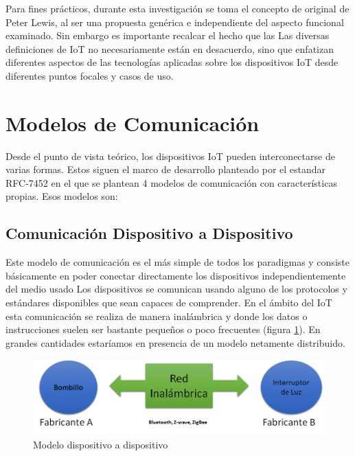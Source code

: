 Para fines prácticos, durante esta investigación se toma el concepto de original de Peter Lewis, al ser una propuesta genérica e independiente del aspecto funcional examinado. Sin embargo es importante recalcar el hecho que las Las diversas definiciones de IoT no necesariamente están en desacuerdo, sino que enfatizan diferentes aspectos de las tecnologías aplicadas sobre los dispositivos IoT desde diferentes puntos focales y casos de uso\cite{iotInternetSociety}.

\vspace{50px}

\section{Modelos de Comunicación}
Desde el punto de vista teórico, los dispositivos IoT pueden interconectarse de varias formas. Estos siguen el marco de desarrollo planteado por el estandar RFC-7452\cite{rfc7452} en el que se plantean 4 modelos de comunicación con características propias. Esos modelos son:

\subsection{Comunicación Dispositivo a Dispositivo}
Este modelo de comunicación es el más simple de todos los paradigmas y consiste básicamente en poder conectar directamente los dispositivos independientemente del medio usado Los dispositivos se comunican usando alguno de los protocolos y estándares disponibles que sean capaces de comprender. En el ámbito del IoT esta comunicación se realiza de manera inalámbrica y donde los datos o instrucciones suelen ser bastante pequeños o poco frecuentes (figura \ref{fig:d2d}). En grandes cantidades estaríamos en presencia de un modelo netamente distribuido.
\begin{figure}[htb]
\centering
\includegraphics[scale=0.38]{./Figuras/d2d.png}
\caption{Modelo dispositivo a dispositivo}
\label{fig:d2d}
\vspace*{-10pt}
\end{figure}

